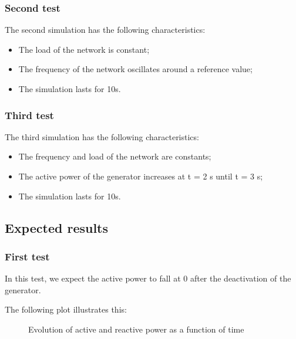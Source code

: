 \documentclass[a4paper, 12pt]{report}
\begin{document}
\subsubsection*{Second test}
The second simulation has the following characteristics:
\begin{itemize}
\item The load of the network is constant;
\item The frequency of the network oscillates around a reference value;
\item The simulation lasts for 10s.
\end{itemize}


\subsubsection*{Third test}
The third simulation has the following characteristics:
\begin{itemize}
\item The frequency and load of the network are constants;
\item The active power of the generator increases at t = 2 s until t = 3 s;
\item The simulation lasts for 10s.
\end{itemize}

\subsection*{Expected results}
\subsubsection*{First test}

In this test, we expect the active power to fall at 0 after the deactivation of
the generator.

The following plot illustrates this:
\begin{figure}[H]
  \caption{Evolution of active and reactive power as a function of time}
\end{figure}
\end{document}
